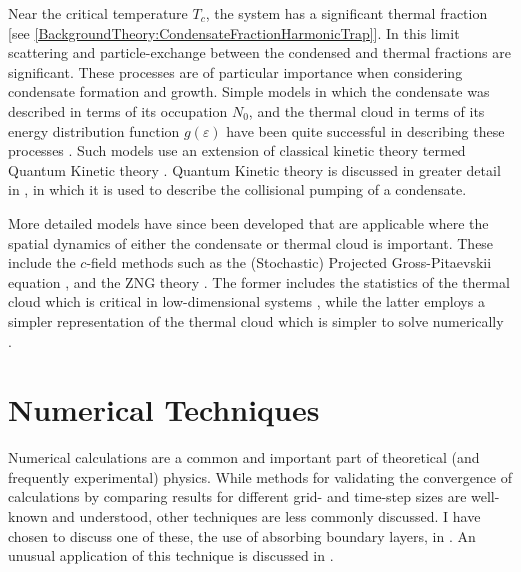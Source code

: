 Near the critical temperature $T_c$, the system has a significant thermal fraction [see \eqref{BackgroundTheory:CondensateFractionHarmonicTrap}].  In this limit scattering and particle-exchange between the condensed and thermal fractions are significant.  These processes are of particular importance when considering condensate formation and growth.  Simple models in which the condensate was described in terms of its occupation $N_0$, and the thermal cloud in terms of its energy distribution function $g(\varepsilon)$ have been quite successful in describing these processes \citep{Davis:2000vn,Bijlsma:2000}.  Such models use an extension of classical kinetic theory termed Quantum Kinetic theory \citep{Gardiner:1997tz,Jaksch:1997ug,Gardiner:1998wx,Jaksch:1998sj,Gardiner:2000ug,Lee:2000vs,Davis:2000vn}.  Quantum Kinetic theory is discussed in greater detail in , in which it is used to describe the collisional pumping of a condensate.

More detailed models have since been developed that are applicable where the spatial dynamics of either the condensate or thermal cloud is important.  These include the $c$-field methods such as the (Stochastic) Projected Gross-Pitaevskii equation \citep{Blakie:2008a}, and the ZNG theory \citep{Zaremba:1999,Proukakis:2008}.  The former includes the statistics of the thermal cloud which is critical in low-dimensional systems \citep{Blakie:2008a}, while the latter employs a simpler representation of the thermal cloud which is simpler to solve numerically \citep{Proukakis:2008}.

\section{Numerical Techniques}
\label{BackgroundTheory:NumericalTechniques}

Numerical calculations are a common and important part of theoretical (and frequently experimental) physics.  While methods for validating the convergence of calculations by comparing results for different grid- and time-step sizes are well-known and understood, other techniques are less commonly discussed.  I have chosen to discuss one of these, the use of absorbing boundary layers, in .  An unusual application of this technique is discussed in .

